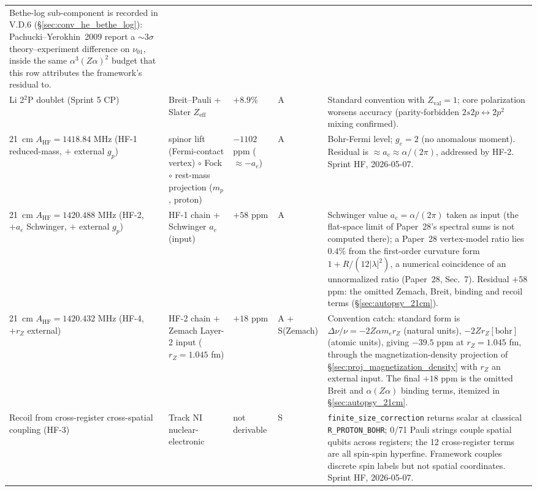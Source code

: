 \documentclass[11pt]{article}
\begin{document}
{\begin{longtable}{p{3.8cm} p{2.5cm} p{1.5cm} p{1.4cm} p{4.5cm}}
Bethe-log sub-component is recorded in V.D.6
(\S\ref{sec:conv_he_bethe_log}): Pachucki--Yerokhin~2009 report a
$\sim3\sigma$ theory--experiment difference on $\nu_{01}$, inside the
same $\alpha^3(Z\alpha)^2$ budget that this row attributes the
framework's residual to. \\
Li 2$^2$P doublet (Sprint 5 CP) & Breit--Pauli + Slater $Z_{\text{eff}}$
& $+8.9\%$ & A & Standard convention with $Z_\text{val}=1$;
core polarization worsens accuracy (parity-forbidden
$2s2p \leftrightarrow 2p^2$ mixing confirmed). \\
21~cm $A_\text{HF} = 1418.84$ MHz (HF-1 reduced-mass, $+$ external $g_p$)
& spinor lift (Fermi-contact vertex) $\circ$ Fock $\circ$ rest-mass
projection ($m_p$, proton) & $-1102$ ppm ($\approx -a_e$) & A & Bohr-Fermi level;
$g_e = 2$ (no anomalous moment).  Residual is $\approx a_e \approx
\alpha/(2\pi)$, addressed by HF-2.  Sprint HF, 2026-05-07. \\
21~cm $A_\text{HF} = 1420.488$ MHz (HF-2, $+a_e$ Schwinger, $+$ external
$g_p$) & HF-1 chain $+$ Schwinger $a_e$ (input) & $+58$ ppm & A
& Schwinger
value $a_e = \alpha/(2\pi)$ taken as input (the flat-space limit of Paper~28's spectral sums is not computed there);
a Paper~28 vertex-model ratio lies $0.4\%$ from the first-order curvature
form $1 + R/(12|\lambda|^2)$, a numerical coincidence of an unnormalized
ratio (Paper~28, Sec.~7).  Residual $+58$ ppm: the omitted Zemach,
Breit, binding and recoil terms (\S\ref{sec:autopsy_21cm}). \\
21~cm $A_\text{HF} = 1420.432$ MHz (HF-4, $+r_Z$ external) & HF-2 chain
$+$ Zemach Layer-2 input ($r_Z = 1.045$ fm) & $+18$ ppm & A + S(Zemach)
& Convention catch: standard form is $\Delta\nu/\nu = -2 Z\alpha m_e r_Z$
(natural units), $-2 Z r_Z[\text{bohr}]$ (atomic units), giving
$-39.5$ ppm at $r_Z = 1.045$ fm, through the magnetization-density
projection of \S\ref{sec:proj_magnetization_density} with $r_Z$ an
external input.  The final
$+18$ ppm is the omitted Breit and $\alpha(Z\alpha)$ binding terms,
itemized in \S\ref{sec:autopsy_21cm}. \\
Recoil from cross-register cross-spatial coupling (HF-3) & Track NI
nuclear-electronic & not derivable & S & \texttt{finite\_size\_correction}
returns scalar at classical \texttt{R\_PROTON\_BOHR}; 0/71 Pauli strings
couple spatial qubits across registers; the 12 cross-register terms are
all spin-spin hyperfine.  Framework couples discrete spin labels but
not spatial coordinates.  Sprint HF, 2026-05-07. \\

\end{longtable}}
\end{document}
